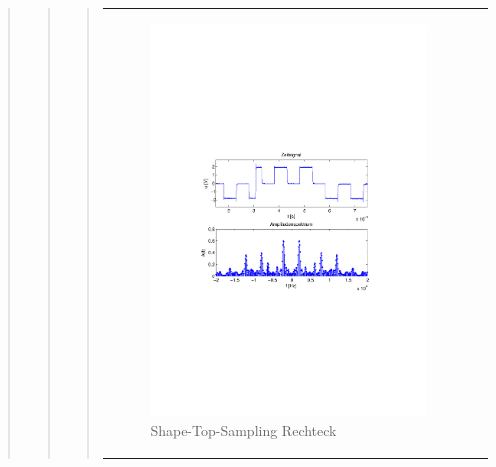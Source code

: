 \begin{quote}
\begin{quote}
\begin{quote}
\begin{center}
\begin{tabular}{ll}
            \hspace{-5cm}
                \begin{minipage}{0.6\textwidth}
                    \begin{figure}[H]
                        \includegraphics[scale=0.55, trim = 16mm 70mm 16mm 85mm, clip]{Bilder/shapeskizze}
                          \caption{Shape-Top-Sampling Rechteck}
		                  \label{fig:shaperec}
                    \end{figure}
                \end{minipage}
                

\end{tabular}
\end{center}
\end{quote}
\end{quote}
\end{quote}
